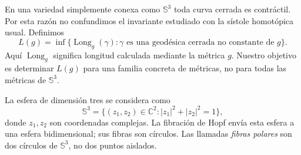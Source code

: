 \documentclass[11pt,a4paper]{article}
\theoremstyle{remark}\newtheorem{remark}[theorem]{Observación}
\newcommand{\Sthree}{\mathbb S^3}
\newcommand{\C}{\mathbb C}
\newcommand{\Len}{\operatorname{Long}}
\begin{document}
En una variedad simplemente conexa como $\Sthree$ toda curva cerrada es contráctil. Por esta razón no confundimos el invariante estudiado con la sístole homotópica usual. Definimos
\begin{equation}\label{eq:defL}
L(g)=\inf\{\Len_g(\gamma):\gamma\text{ es una geodésica cerrada no constante de }g\}.
\end{equation}
Aquí $\Len_g$ significa longitud calculada mediante la métrica $g$. Nuestro objetivo es determinar $L(g)$ para una familia concreta de métricas, no para todas las métricas de $\Sthree$.

La esfera de dimensión tres se considera como
\[
\Sthree=\{(z_1,z_2)\in\C^2:\lvert z_1\rvert^2+\lvert z_2\rvert^2=1\},
\]
donde $z_1,z_2$ son coordenadas complejas. La fibración de Hopf envía esta esfera a una esfera bidimensional; sus fibras son círculos. Las llamadas \emph{fibras polares} son dos círculos de $\Sthree$, no dos puntos aislados.
\end{document}
